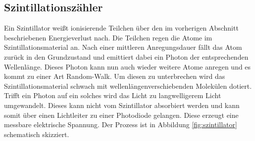 \subsection{Szintillationszähler}
Ein Szintillator weißt ionisierende Teilchen über den im vorherigen Abschnitt beschriebenen Energieverlust nach. Die Teilchen regen die Atome im Szintillationsmaterial an. Nach einer mittleren Anregungsdauer fällt das Atom zurück in den Grundzustand und emittiert dabei ein Photon der entsprechenden Wellenlänge. Dieses Photon kann nun auch wieder weitere Atome anregen und es kommt zu einer Art Random-Walk. Um diesen zu unterbrechen wird das Szintillationsmaterial schwach mit wellenlängenverschiebenden Molekülen dotiert. Trifft ein Photon auf ein solches wird das Licht zu langwelligerem Licht umgewandelt. Dieses kann nicht vom Szintillator absorbiert werden und kann somit über einen Lichtleiter zu einer Photodiode gelangen. Diese erzeugt eine messbare elektrische Spannung. Der Prozess ist in Abbildung \ref{fig:szintillator} schematisch skizziert.

